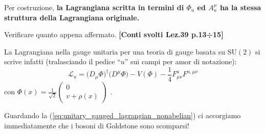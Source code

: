 \documentclass[../main.tex]{subfiles}
\begin{document}
Per costruzione, \textbf{la Lagrangiana scritta in termini di $\Phi_u$ ed $A^\mu_u$ ha la stessa struttura della Lagrangiana originale.}
\begin{exercise}
    Verificare quanto appena affermato. \textbf{[Conti svolti Lez.39 p.13÷15]}
\end{exercise}

La Lagrangiana nella gauge unitaria per una teoria di gauge basata su SU$(2)$ si scrive infatti (tralasciando il pedice “$u$” sui campi per amor di notazione):
\begin{equation}
    \boxed{\mathscr{L}_u = \big(D_\mu\Phi\big)^\dagger\big(D^\mu\Phi\big) - V(\Phi) - \frac{1}{4}F_{\mu\nu}^aF^{a,\mu\nu}}
    \label{eq:unitary_gauged_lagrangian_nonabelian}
\end{equation}
con $\Phi(x) = \frac{1}{\sqrt{2}}\begin{pmatrix}0\\v+\rho(x)\end{pmatrix}$ . 

Guardando la (\ref{eq:unitary_gauged_lagrangian_nonabelian}) ci accorgiamo immediatamente che i bosoni di Goldstone sono scomparsi!
\end{document}
